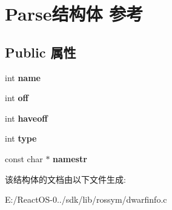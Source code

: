 \hypertarget{struct_parse}{}\section{Parse结构体 参考}
\label{struct_parse}
\subsection*{Public 属性}
\begin{DoxyCompactItemize}
\item 
\mbox{\label{struct_parse_a41cdd213c1053400e09b2dc147ff351c}} 
int {\bfseries name}
\item 
\mbox{\label{struct_parse_aa731f181747f0c1efc12e1e61f4a9ceb}} 
int {\bfseries off}
\item 
\mbox{\label{struct_parse_ae65017eadb373a038707eebb6261c4fd}} 
int {\bfseries haveoff}
\item 
\mbox{\label{struct_parse_a13531c88dc61f45a0019289461cb0091}} 
int {\bfseries type}
\item 
\mbox{\label{struct_parse_adea17a3e7eb0aa80a40739d629b116e2}} 
const char $\ast$ {\bfseries namestr}
\end{DoxyCompactItemize}


该结构体的文档由以下文件生成\+:\begin{DoxyCompactItemize}
\item 
E\+:/\+React\+O\+S-\/0../sdk/lib/rossym/dwarfinfo.\+c\end{DoxyCompactItemize}
